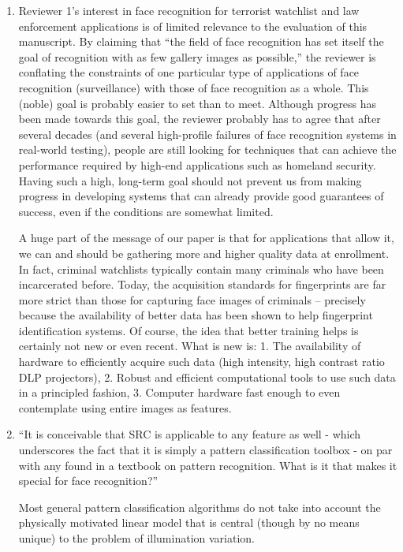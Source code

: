 \documentclass[11pt]{article}
\begin{document}
\begin{enumerate}
\item Reviewer 1's interest in face recognition for terrorist watchlist and law
enforcement applications is of limited relevance to the evaluation of this
manuscript.  By claiming that ``the field of face recognition has set itself the
goal of recognition with as few gallery images as possible,'' the reviewer is
conflating the constraints of one particular type of applications of face recognition
(surveillance) with those of face recognition as a whole. This (noble) goal is probably easier to
set than to meet. Although progress has been made towards this goal, the reviewer
probably has to agree that after several decades (and several high-profile failures of
face recognition systems in real-world testing), people are still looking for techniques 
that can achieve the performance required by high-end applications such as homeland 
security. Having such a high, long-term goal should not prevent us from making progress in developing systems that 
can already provide good guarantees of success, even if the conditions are somewhat limited. 

A huge part of the message of our paper is that for applications that allow it, we can and should
be gathering more and higher quality data at enrollment. In fact, criminal watchlists typically contain many criminals who have been incarcerated before. Today,
the acquisition standards for fingerprints are far more strict than those for
capturing face images of criminals -- precisely because the availability of better data has been shown to 
help fingerprint identification systems. Of course, the idea that better training helps is certainly
not new or even recent.  What is new is: 1. The availability
of hardware to efficiently acquire such data (high intensity, high contrast
ratio DLP projectors), 2. Robust and efficient computational tools to use such data in a
principled fashion, 3. Computer hardware fast enough to even contemplate using
entire images as features.


\item ``It is conceivable that SRC is applicable to any feature as well - which
underscores the fact that it is simply a pattern classification toolbox - on
par with any found in a textbook on pattern recognition. What is it that makes
it special for face recognition?''

Most general pattern classification algorithms do not take into account the
physically motivated linear model that is central (though by no means unique)
to the problem of illumination variation.


\end{enumerate}
\end{document}
